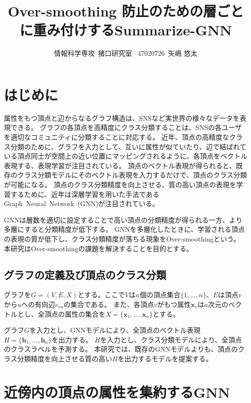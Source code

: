 \documentclass[a4j,twocolumn]{jsarticle}
\title{Over-smoothing 防止のための層ごとに重み付けするSummarize-GNN}
\author{情報科学専攻~猪口研究室~
47020726~矢嶋 悠太 }
\date{}
\begin{document}
\maketitle

\section{はじめに}
\label{sec_introduction}
\vspace{-1mm}
属性をもつ頂点と辺からなるグラフ構造は、SNSなど実世界の様々なデータを表現できる。
グラフの各頂点を高精度にクラス分類することは、SNSの各ユーザを適切なコミュニティに分類することに対応する。
近年、頂点の高精度なクラス分類のために、グラフを入力として、互いに属性が似ていたり、辺で結ばれている頂点同士が空間上の近い位置にマッピングされるように、各頂点をベクトル表現する、表現学習が注目されている。
頂点のベクトル表現が得られると、既存のクラス分類モデルにそのベクトル表現を入力するだけで、頂点のクラス分類が可能になる。
頂点のクラス分類精度を向上させる、質の高い頂点の表現を学習するために、近年は深層学習を用いた手法であるGraph~Neural~Network~(GNN)\cite{Kipf}\cite{Velickovic}が注目されている。

GNNは層数を適切に設定することで高い頂点の分類精度が得られる一方、より多層にすると分類精度が低下する。
GNNを多層化したときに、学習される頂点の表現の質が低下し、クラス分類精度が落ちる現象をOver-smoothingという。
本研究はOver-smoothingの課題を解決することを目的とする。


\vspace{+1mm}
\subsection*{グラフの定義及び頂点のクラス分類}

グラフを$G=(V,E,X)$とする。ここで$V$は$n$個の頂点集合$\{1,\ldots,n\}$、$E$は頂点$v$から$u$への有向辺$e_{vu}$の集合である。
また、各頂点$v$がもつ属性$\bm{x}_v$は$a$次元のベクトルとし、全頂点の属性の集合を$X=\{ \bm{x}_1, \ldots, \bm{x}_n \}$とする。

グラフ$G$を入力とし、GNNモデルにより、全頂点のベクトル表現$H=\{\bm{h}_1, \ldots ,\bm{h}_n\}$を出力する。
$H$を入力とし、クラス分類モデルにより、全頂点のクラスラベルを予測する。
本研究では、既存のGNNモデル\cite{Kipf}\cite{Velickovic}よりも、頂点のクラス分類精度を向上させる質の高い$H$を出力するモデルを提案する。


\section{近傍内の頂点の属性を集約するGNN}
\label{sec_gnn}
\end{document}
